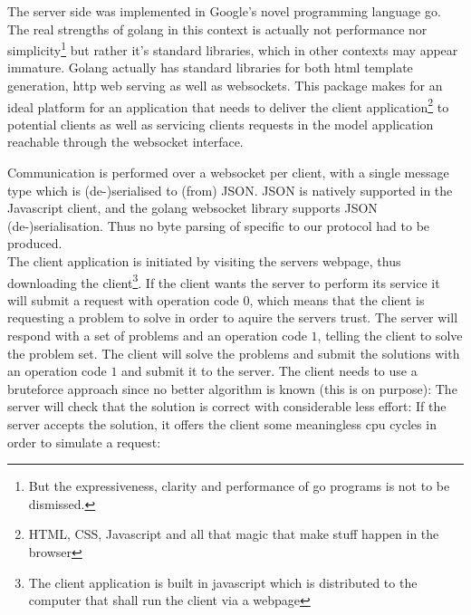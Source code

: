 The server side was implemented in Google's novel programming language go\cite{golang}. The real strengths of golang in this context is actually not performance nor simplicity\footnote{But the expressiveness, clarity and performance of go programs is not to be dismissed.} but rather it's standard libraries, which in other contexts may appear immature. Golang actually has standard libraries for both html template generation, http web serving as well as websockets. This package makes for an ideal platform for an application that needs to deliver the client application\footnote{HTML, CSS, Javascript and all that magic that make stuff happen in the browser} to potential clients as well as servicing clients requests in the model application reachable through the websocket interface. 

Communication is performed over a websocket per client, with a single message type which is (de-)serialised to (from) JSON. JSON is natively supported in the Javascript client, and the golang websocket library supports JSON (de-)serialisation. Thus no byte parsing of specific to our protocol had to be produced.
\\
The client application is initiated by visiting the servers webpage, thus downloading the client\footnote{The client application is built in javascript which is distributed to the computer that shall run the client via a webpage}. If the client wants the server to perform its service it will submit a request with operation code $0$, which means that the client is requesting a problem to solve in order to aquire the servers trust. The server will respond with a set of problems and an operation code $1$, telling the client to solve the problem set. The client will solve the problems and submit the solutions with an operation code $1$ and submit it to the server. The client needs to use a bruteforce approach since no better algorithm is known (this is on purpose):
The server will check that the solution is correct with considerable less effort:
If the server accepts the solution, it offers the client some meaningless cpu cycles in order to simulate a request:






